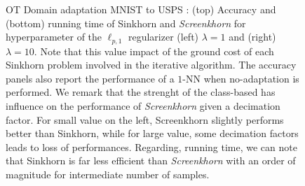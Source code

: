\begin{figure}[htbp]
	\caption{OT Domain adaptation MNIST to USPS : (top) Accuracy and (bottom) running time of Sinkhorn and \emph{Screenkhorn} for hyperparameter of the $\ell_{p,1}$ regularizer (left) $\lambda = 1$ and (right) $\lambda=10$. Note that this
	value impact of the ground cost of each Sinkhorn problem involved in the iterative algorithm. The accuracy panels
	also report the performance of a $1$-NN when no-adaptation is performed.  
	We remark that the strenght of the class-based has influence on the performance of \emph{Screenkhorn} given a decimation factor. For small value on the left, Screenkhorn slightly performs better than Sinkhorn, while for large value, some
	decimation factors leads to loss of performances.
	Regarding, running time, we can note that Sinkhorn is far less efficient than
	\emph{Screenkhorn}  with an order of magnitude for intermediate number of samples.
	\label{fig:otda:mnist:extra}}
\end{figure}


